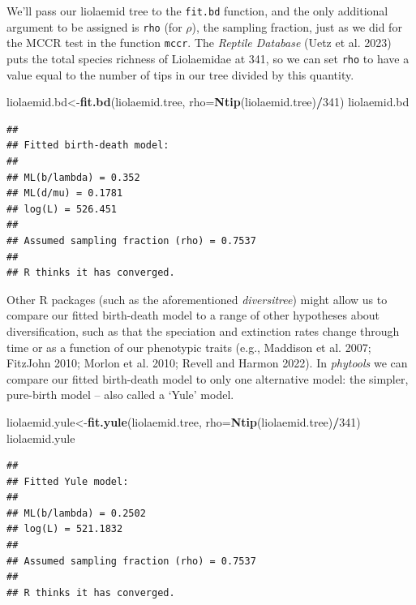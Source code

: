 \documentclass[fleqn,10pt,lineno]{wlpeerj} %
\newenvironment{Shaded}{\begin{snugshade}}{\end{snugshade}}
\newcommand{\AttributeTok}[1]{\textcolor[rgb]{0.13,0.29,0.53}{#1}}
\newcommand{\DecValTok}[1]{\textcolor[rgb]{0.00,0.00,0.81}{#1}}
\newcommand{\FunctionTok}[1]{\textcolor[rgb]{0.13,0.29,0.53}{\textbf{#1}}}
\newcommand{\NormalTok}[1]{#1}
\newcommand{\OtherTok}[1]{\textcolor[rgb]{0.56,0.35,0.01}{#1}}
\newcommand{\SpecialCharTok}[1]{\textcolor[rgb]{0.81,0.36,0.00}{\textbf{#1}}}
\begin{document}
We'll pass our liolaemid tree to the \texttt{fit.bd} function, and the only additional argument to be assigned is \texttt{rho} (for \(\rho\)), the sampling fraction, just as we did for the MCCR test in the function \texttt{mccr}. The \emph{Reptile Database} (Uetz et al. 2023) puts the total species richness of Liolaemidae at 341, so we can set \texttt{rho} to have a value equal to the number of tips in our tree divided by this quantity.

\begin{Shaded}
\begin{Highlighting}[]
\NormalTok{liolaemid.bd}\OtherTok{\textless{}{-}}\FunctionTok{fit.bd}\NormalTok{(liolaemid.tree,}
  \AttributeTok{rho=}\FunctionTok{Ntip}\NormalTok{(liolaemid.tree)}\SpecialCharTok{/}\DecValTok{341}\NormalTok{)}
\NormalTok{liolaemid.bd}
\end{Highlighting}
\end{Shaded}

\begin{verbatim}
## 
## Fitted birth-death model:
## 
## ML(b/lambda) = 0.352 
## ML(d/mu) = 0.1781 
## log(L) = 526.451 
## 
## Assumed sampling fraction (rho) = 0.7537 
## 
## R thinks it has converged.
\end{verbatim}

Other R packages (such as the aforementioned \emph{diversitree}) might allow us to compare our fitted birth-death model to a range of other hypotheses about diversification, such as that the speciation and extinction rates change through time or as a function of our phenotypic traits (e.g., Maddison et al. 2007; FitzJohn 2010; Morlon et al. 2010; Revell and Harmon 2022). In \emph{phytools} we can compare our fitted birth-death model to only one alternative model: the simpler, pure-birth model -- also called a `Yule' model.

\begin{Shaded}
\begin{Highlighting}[]
\NormalTok{liolaemid.yule}\OtherTok{\textless{}{-}}\FunctionTok{fit.yule}\NormalTok{(liolaemid.tree,}
  \AttributeTok{rho=}\FunctionTok{Ntip}\NormalTok{(liolaemid.tree)}\SpecialCharTok{/}\DecValTok{341}\NormalTok{)}
\NormalTok{liolaemid.yule}
\end{Highlighting}
\end{Shaded}

\begin{verbatim}
## 
## Fitted Yule model:
## 
## ML(b/lambda) = 0.2502 
## log(L) = 521.1832 
## 
## Assumed sampling fraction (rho) = 0.7537 
## 
## R thinks it has converged.
\end{verbatim}
\end{document}
